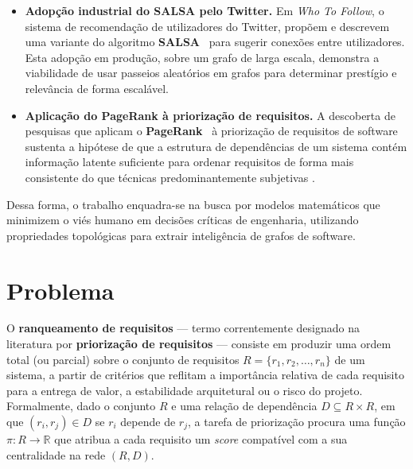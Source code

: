 \begin{itemize}
    \item \textbf{Adopção industrial do SALSA pelo Twitter.}
        Em \emph{Who To Follow}, o sistema de recomendação de
        utilizadores do Twitter, \citet{gupta2013} propõem e descrevem
        uma variante do algoritmo \textbf{SALSA}~\parencite{lempel2001}
        para sugerir conexões entre utilizadores. Esta adopção em
        produção, sobre um grafo de larga escala, demonstra a
        viabilidade de usar passeios aleatórios em grafos para
        determinar prestígio e relevância de forma escalável.

    \item \textbf{Aplicação do PageRank à priorização de requisitos.}
        A descoberta de pesquisas que aplicam o
        \textbf{PageRank}~\parencite{page1999} à priorização de
        requisitos de software
        \parencite{silva2018, jin2009, li2009} sustenta a hipótese de
        que a estrutura de dependências de um sistema contém
        informação latente suficiente para ordenar requisitos de forma
        mais consistente do que técnicas predominantemente subjetivas
        \parencite{firesmith2004, achimugu2014}.
\end{itemize}

Dessa forma, o trabalho enquadra-se na busca por modelos matemáticos
que minimizem o viés humano em decisões críticas de engenharia,
utilizando propriedades topológicas para extrair inteligência de grafos
de software.

\section{Problema}
\label{sec:problema}

O \textbf{ranqueamento de requisitos} --- termo correntemente
designado na literatura por \textbf{priorização de requisitos}
\parencite{karlsson2002, firesmith2004, silva2018, bukhsh2020} ---
consiste em produzir uma ordem total (ou parcial) sobre o conjunto de
requisitos $R = \{r_1, r_2, \ldots, r_n\}$ de um sistema, a partir de
critérios que reflitam a importância relativa de cada requisito para a
entrega de valor, a estabilidade arquitetural ou o risco do projeto.
Formalmente, dado o conjunto $R$ e uma relação de dependência
$D \subseteq R \times R$, em que $(r_i, r_j) \in D$ se $r_i$ depende
de $r_j$, a tarefa de priorização procura uma função
$\pi: R \rightarrow \mathbb{R}$ que atribua a cada requisito um
\emph{score} compatível com a sua centralidade na rede $(R, D)$.

